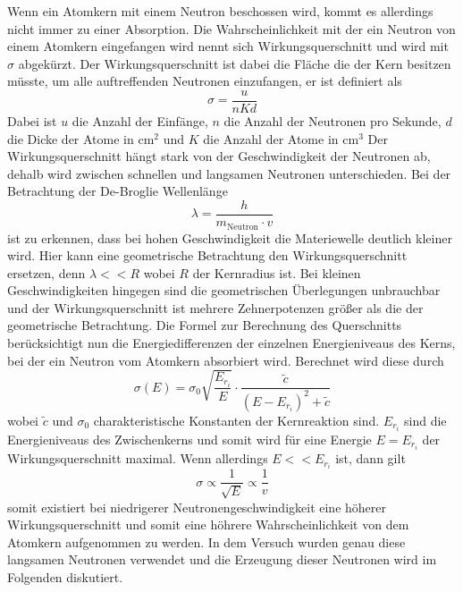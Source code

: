 Wenn ein Atomkern mit einem Neutron beschossen wird, kommt es allerdings nicht immer zu einer Absorption. Die Wahrscheinlichkeit mit der ein Neutron von einem Atomkern eingefangen wird nennt sich
Wirkungsquerschnitt und wird mit $\sigma$ abgekürzt.
Der Wirkungsquerschnitt ist dabei die Fläche die der Kern besitzen müsste, um alle auftreffenden Neutronen einzufangen, er ist definiert als
\begin{equation}
\sigma = \frac{u}{nKd}
\end{equation}
Dabei ist $u$ die Anzahl der Einfänge, $n$ die Anzahl der Neutronen pro Sekunde, $d$ die Dicke der Atome in $\si{\centi\meter\squared}$ und $K$ die Anzahl der Atome in $\si{\centi\meter\cubed}$
Der Wirkungsquerschnitt hängt stark von der Geschwindigkeit der Neutronen ab, dehalb wird zwischen schnellen und langsamen Neutronen unterschieden.
Bei der Betrachtung der De-Broglie Wellenlänge
\begin{equation}
\lambda = \frac{h}{m_{\text{Neutron}} \cdot v} 
\end{equation}
ist zu erkennen, dass bei hohen Geschwindigkeit die Materiewelle deutlich kleiner wird. Hier kann eine geometrische Betrachtung den Wirkungsquerschnitt ersetzen, denn $\lambda << R$ wobei $R$ der Kernradius ist.
Bei kleinen Geschwindigkeiten hingegen sind die geometrischen Überlegungen unbrauchbar und der Wirkungsquerschnitt ist mehrere Zehnerpotenzen größer als die der geometrische Betrachtung.
Die Formel zur Berechnung des Querschnitts berücksichtigt nun die Energiedifferenzen der einzelnen Energieniveaus des Kerns, bei der ein Neutron vom Atomkern absorbiert wird.
Berechnet wird diese durch
\begin{equation}
\sigma(E) = \sigma_{0} \sqrt{\frac{E_{r_{i}}}{E}} \cdot \frac{\tilde{c}}{(E - E_{r_{i}})^{2} + \tilde{c}}
\end{equation}
wobei $\tilde c$ und $\sigma_{0}$ charakteristische Konstanten der Kernreaktion sind. $E_{{r}_{i}}$ sind die Energieniveaus des Zwischenkerns und somit wird für eine Energie $E = E_{{r}_{i}}$
der Wirkungsquerschnitt maximal. Wenn allerdings $E << E_{{r}_{i}}$ ist, dann gilt
\begin{equation}
\sigma \propto \frac{1}{\sqrt{E}} \propto \frac{1}{v}
\end{equation}
somit existiert bei niedrigerer Neutronengeschwindigkeit eine höherer Wirkungsquerschnitt und somit eine höhrere Wahrscheinlichkeit von dem Atomkern aufgenommen zu werden.
In dem Versuch wurden genau diese langsamen Neutronen verwendet und die Erzeugung dieser Neutronen wird im Folgenden diskutiert.

